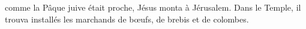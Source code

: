 \encetemps comme la Pâque juive était proche,
	Jésus monta à Jérusalem.
Dans le Temple, il trouva installés les marchands de bœufs, de brebis et de colombes.

